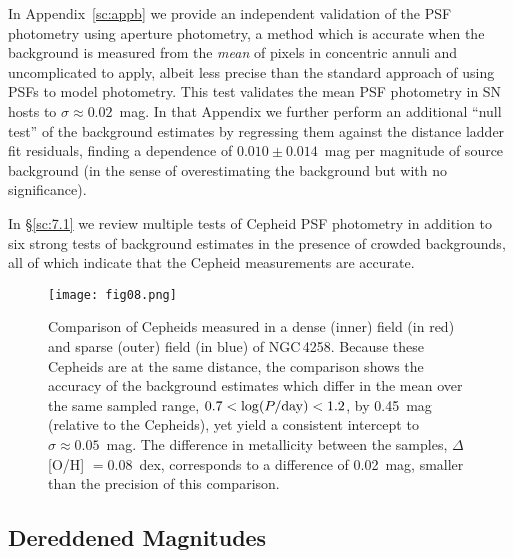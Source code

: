\documentclass[12pt]{aastex631}
\begin{document}
In Appendix~\ref{sc:appb} we provide an independent validation of the PSF photometry using aperture photometry, a method which is accurate when the background is measured from the {\it mean} of pixels in concentric annuli and uncomplicated to apply, albeit less precise than the standard approach of using PSFs to model photometry.  This test validates the mean PSF photometry in SN hosts to $\sigma \approx 0.02$~mag. In that Appendix we further perform an additional ``null test'' of the background estimates by regressing them against the distance ladder fit residuals, finding a dependence of $0.010 \pm 0.014$~mag per magnitude of source background (in the sense of overestimating the background but with no significance). 

In \S\ref{sc:7.1} we review multiple tests of Cepheid PSF photometry in addition to six strong tests of background estimates in the presence of crowded backgrounds, all of which indicate that the Cepheid measurements are accurate.

\clearpage

\begin{figure}[t]   
\begin{center}
\texttt{[image: fig08.png]}
\end{center}
\caption{\label{fg:crowd} Comparison of Cepheids measured in a dense (inner) field (in red) and sparse (outer) field (in blue) of NGC$\,$4258.  Because these Cepheids are at the same distance, the comparison shows the accuracy of the background estimates which differ in the mean over the same sampled range, $ 0.7 < \log (P/{\rm day}) < 1.2 $, by 0.45~mag (relative to the Cepheids), yet yield a consistent intercept to $\sigma \approx 0.05$~mag.   The difference in metallicity between the samples, $\Delta$[O/H] $= 0.08$~dex, corresponds to a difference of 0.02~mag, smaller than the precision of this comparison.}
\end{figure}

\subsection{Dereddened Magnitudes\label{sc:3.4}}
\end{document}
